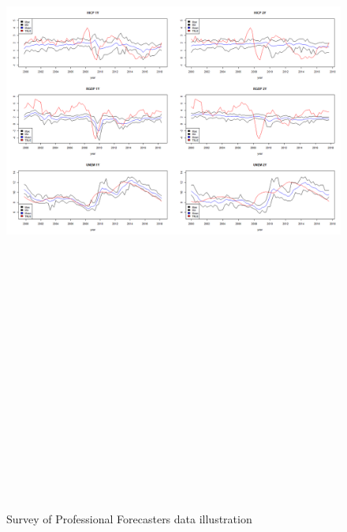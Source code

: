 \documentclass[]{article}
\begin{document}
\begin{figure}[!h]
\centering
\includegraphics[width=16cm, height=26cm]{./Output/Images/SPF.png}
\caption{Survey of Professional Forecasters data illustration}\label{SPF data illustration}
\end{figure}
\end{document}
